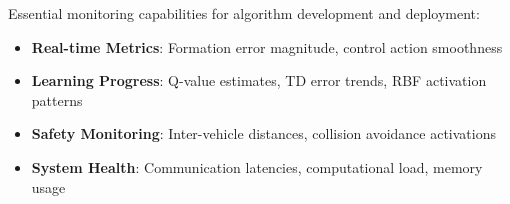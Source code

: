 \documentclass[11pt,a4paper]{article}
\begin{document}
Essential monitoring capabilities for algorithm development and deployment:

\begin{itemize}
    \item \textbf{Real-time Metrics}: Formation error magnitude, control action smoothness
    \item \textbf{Learning Progress}: Q-value estimates, TD error trends, RBF activation patterns
    \item \textbf{Safety Monitoring}: Inter-vehicle distances, collision avoidance activations
    \item \textbf{System Health}: Communication latencies, computational load, memory usage
\end{itemize}
\end{document}
